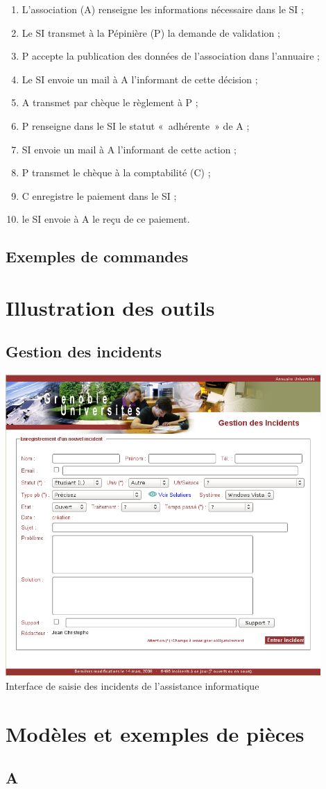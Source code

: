 \begin{enumerate}
\item L'association (A) renseigne les informations nécessaire dans le SI ;
\item Le SI transmet à la Pépinière (P) la demande de validation ;
\item P accepte la publication des données de l'association dans l'annuaire ;
\item Le SI envoie un mail à A l'informant de cette décision ;
\item A transmet par chèque le règlement à P ;
\item P renseigne dans le SI le statut «~adhérente~» de A ;
\item SI envoie un mail à A l'informant de cette action ;
\item P transmet le chèque à la comptabilité (C) ;
\item C enregistre le paiement dans le SI ;
\item le SI envoie à A le reçu de ce paiement.
\end{enumerate}

\subsection{Exemples de commandes}
\section{Illustration des outils}
\subsection{Gestion des incidents}
\label{gestion_incidents}
\begin{center}
	\includegraphics[width=12cm]{annexes/images/gestion_des_incidents.png} \\
	\caption{Interface de saisie des incidents de l'assistance informatique}
\end{center}
\section{Modèles et exemples de pièces}
\subsection{A}

